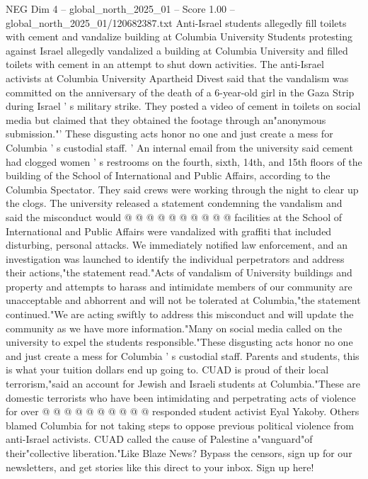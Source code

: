 \begin{textsample}{NEG Dim 4 – global\_north\_2025\_01 – Score 1.00 – global\_north\_2025\_01/120682387.txt}  \label{ex:f4_neg_412}
Anti-Israel students allegedly fill toilets with cement and vandalize building at Columbia University Students protesting against Israel allegedly vandalized a building at Columbia University and filled toilets with cement in an attempt to shut down activities.
The anti-Israel activists at Columbia University Apartheid Divest said that the vandalism was committed on the anniversary of the death of a 6-year-old girl in the Gaza Strip during Israel ' s military strike.
They posted a video of cement in toilets on social media but claimed that they obtained the footage through an"anonymous submission."' These disgusting acts honor no one and just create a mess for Columbia ' s custodial staff. ' An internal email from the university said cement had clogged women ' s restrooms on the fourth, sixth, 14th, and 15th floors of the building of the School of International and Public Affairs, according to the Columbia Spectator.
They said crews were working through the night to clear up the clogs.
The university released a statement condemning the vandalism and said the misconduct would @ @ @ @ @ @ @ @ @ @ facilities at the School of International and Public Affairs were vandalized with graffiti that included disturbing, personal attacks.
We immediately notified law enforcement, and an investigation was launched to identify the individual perpetrators and address their actions,"the statement read."Acts of vandalism of University buildings and property and attempts to harass and intimidate members of our community are unacceptable and abhorrent and will not be tolerated at Columbia,"the statement continued."We are acting swiftly to address this misconduct and will update the community as we have more information."Many on social media called on the university to expel the students responsible."These disgusting acts honor no one and just create a mess for Columbia ' s custodial staff.
Parents and students, this is what your tuition dollars end up going to.
CUAD is proud of their local terrorism,"said an account for Jewish and Israeli students at Columbia."These are domestic terrorists who have been intimidating and perpetrating acts of violence for over @ @ @ @ @ @ @ @ @ @ responded student activist Eyal Yakoby.
Others blamed Columbia for not taking steps to oppose previous political violence from anti-Israel activists.
CUAD called the cause of Palestine a"vanguard"of their"collective liberation."Like Blaze News?
Bypass the censors, sign up for our newsletters, and get stories like this direct to your inbox.
Sign up here!

\end{textsample}
